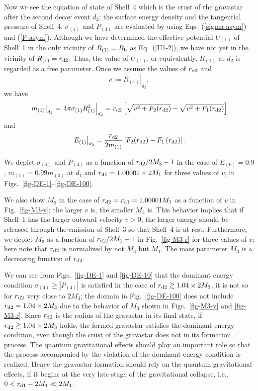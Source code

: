 \documentclass[aps,preprint,preprintnumber,nofootinbib,amsmath,amssymb,ascmac,bm,12pt]{revtex4}
\newcommand{\rdo}{r_{\rm d1}}
\newcommand{\rdt}{r_{\rm d2}}
\newcommand{\Rb}{R_{\rm b}}
\newcommand{\mz}{m_{(0)}}
\newcommand{\mo}{m_{(1)}}
\newcommand{\Ron}{R_{(1)}}
\newcommand{\Uon}{U_{(1)}}
\newcommand{\Eze}{E_{(0)}}
\newcommand{\Eon}{E_{(1)}}
\begin{document}
Now we see the equation of state of Shell~4 
which is the crust of the gravastar after the second decay event $d_2$; 
the surface energy density and the tangential pressure of Shell~4, 
$\sigma_{(4)}$ and $P_{(4)}$ are evaluated 
by using Eqs.~(\ref{sigma-asym}) and (\ref{P-asym}).  
Although we have determined the effective potential $\Uon$ of Shell~1 in the only vicinity of $\Ron=\Rb$ as Eq.~(\ref{U1-2}), 
we have not yet in the vicinity of $\Ron=\rdt$. Thus, the value of $\Uon$, or equivalently, $\dot{R}_{(1)}$ at $d_2$ 
is  regarded as a free parameter. Once we assume the values of $\rdt$ and 
$$
v:=\left.\dot{R}_{(1)}\right|_{d_2},
$$
we have
$$
\left.m_{(1)}\right|_{d_2}=\left.4\pi\sigma_{(1)}\Ron^2\right|_{d_2}
=\rdt\left[\sqrt{v^2+F_2(\rdt)}-\sqrt{v^2+F_1(\rdt)}\right]
$$
and
$$
\left.\Eon\right|_{d_2}=\frac{\rdt}{2\mo}\left[F_2(\rdt)-F_1\left(\rdt\right)\right].
$$

We depict $\sigma_{(4)}$ and $P_{(4)}$ as a function of $\rdt/2M_3-1$ 
in the case of $\Eze=0.9$, $\mo=0.99\mz$ at $d_1$ and $\rdo=1.00001\times 2M_1$ for three values of $v$, 
in Figs.~\ref{fig-DE-1}--\ref{fig-DE-100}.  

We also show $M_3$ in the case of $\rdt=\rdo=1.00001\time 2M_1$ as a function of $v$ in Fig.~\ref{fig-M3-v}; 
the larger $v$ is, the smaller $M_3$ is. This behavior implies that if Shell~1 has the larger outward velocity 
$v>0$, the larger energy should be released through the emission of Shell~3 so that Shell~4 is at rest. 
Furthermore, we depict $M_3$ as a function of $\rdt/2M_1-1$ in Fig.~\ref{fig-M3-r} for three values of $v$; 
here note that $\rdt$ is normalized by not $M_3$ but $M_1$.  The mass parameter $M_3$ is a 
decreasing function of $\rdt$. 

We can see from Figs.~\ref{fig-DE-1} and \ref{fig-DE-10} that  
the dominant energy condition $\sigma_{(4)}\geq\left|P_{(4)}\right|$ is satisfied 
in the case of $\rdt \gtrsim 1.04\times 2M_3$, 
it is not so for $\rdt$ very close to $2M_3$; the domain in Fig.~\ref{fig-DE-100} does not 
include  $\rdt = 1.04\times 2M_3$ due to the behavior of $M_3$ shown in Figs.~\ref{fig-M3-v} and \ref{fig-M3-r}.  
Since $\rdt$ is the radius of the gravastar in its final state, if $\rdt \gtrsim 1.04\times 2M_3$ holds, 
the formed gravastar satisfies the dominant energy condition, even though the crust of the gravastar 
does not in its formation process. 
The quantum gravitational effects should play an important role so that 
the process accompanied by the violation of the dominant energy condition is realized.  Hence 
the gravastar formation should rely on the quantum gravitational effects, 
if it begins at the very late stage of the gravitational collapse, i.e., $0<\rdo-2M_1\ll 2M_1$. 
\end{document}
